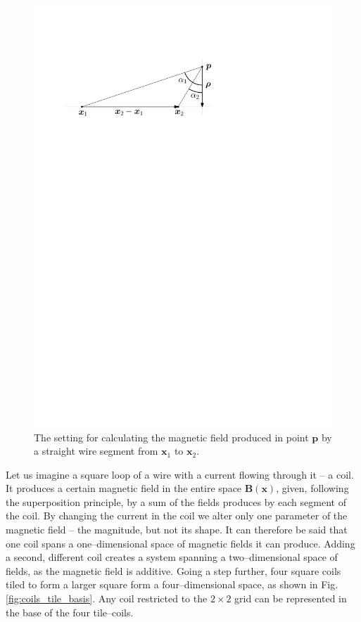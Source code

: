 \begin{figure}
  \centering
  \includegraphics[width=0.8\linewidth]{gfx/coils/biot_savart.pdf}
  \caption{The setting for calculating the magnetic field produced in point $\bm{p}$ by a straight wire segment from $\bm{x}_1$ to $\bm{x}_2$.}
  \label{fig:biot-savart}
\end{figure}

Let us imagine a square loop of a wire with a current flowing through it -- a coil. It produces a certain magnetic field in the entire space $\mathbf{B}(\mathbf{x})$, given, following the superposition principle, by a sum of the fields produces by each segment of the coil. 
By changing the current in the coil we alter only one parameter of the magnetic field -- the magnitude, but not its shape. It can therefore be said that one coil spans a one--dimensional space of magnetic fields it can produce. Adding a second, different coil creates a system spanning a two--dimensional space of fields, as the magnetic field is additive. Going a step further, four square coils tiled to form a larger square form a four--dimensional space, as shown in Fig.\,\ref{fig:coils_tile_basis}. Any coil restricted to the $2 \times 2$ grid can be represented in the base of the four tile--coils.

